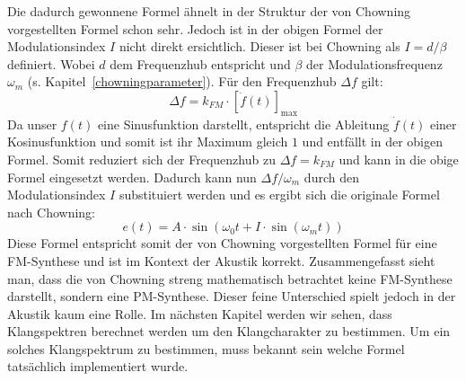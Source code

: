 Die dadurch gewonnene Formel ähnelt in der Struktur der von Chowning vorgestellten Formel schon sehr. Jedoch ist in der obigen Formel der Modulationsindex $I$ nicht direkt ersichtlich. Dieser ist bei Chowning als $I=d/\beta$ definiert. Wobei $d$ dem Frequenzhub entspricht und $\beta$ der Modulationsfrequenz $\omega_m$ (s. Kapitel~\ref{chowningparameter}). Für den Frequenzhub $\Delta f$ gilt: \cite[S. 219]{lathi}
\begin{equation*}
\Delta f = k_{FM}\cdot [\dot f(t)]_{\max}
\end{equation*}
Da unser $f(t)$ eine Sinusfunktion darstellt, entspricht die Ableitung $\dot f(t)$ einer Kosinusfunktion und somit ist ihr Maximum gleich $1$ und entfällt in der obigen Formel. Somit reduziert sich der Frequenzhub zu $\Delta f=k_{FM}$ und kann in die obige Formel eingesetzt werden. Dadurch kann nun $\Delta f / \omega_m$ durch den Modulationsindex $I$ substituiert werden und es ergibt sich die originale Formel nach Chowning:
\begin{equation}
e(t)=A\cdot\sin(\omega_0t+I\cdot\sin(\omega_m t))
\label{eq:FM_Chowning}
\end{equation}
Diese Formel entspricht somit der von Chowning vorgestellten Formel für eine FM-Synthese und ist im Kontext der Akustik korrekt. Zusammengefasst sieht man, dass die von Chowning streng mathematisch betrachtet keine FM-Synthese darstellt, sondern eine PM-Synthese. Dieser feine Unterschied spielt jedoch in der Akustik kaum eine Rolle. Im nächsten Kapitel werden wir sehen, dass Klangspektren berechnet werden um den Klangcharakter zu bestimmen. Um ein solches Klangspektrum zu bestimmen, muss bekannt sein welche Formel tatsächlich implementiert wurde.

\FloatBarrier
